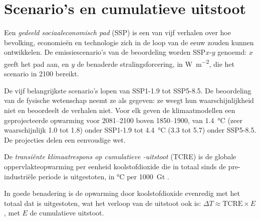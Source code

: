 \section{Scenario's en cumulatieve uitstoot}\label{sec:b2:anthropogenic-climate-change:scenarios}

\begin{definition}\label{def:b2:anthropogenic-climate-change:ssp}
Een \emph{gedeeld sociaaleconomisch pad} (SSP) is een van vijf
verhalen over hoe bevolking, economieën en technologie zich in de loop van de eeuw zouden kunnen ontwikkelen. De
emissiescenario's van de beoordeling worden SSP$x$-$y$ genoemd: $x$ geeft het pad aan, en $y$ de
benaderde stralingsforcering, in \unit{W.m^{-2}}, die het scenario in 2100 bereikt.
\end{definition}

De vijf belangrijkste scenario's lopen van SSP1-1.9 tot SSP5-8.5. De beoordeling van de fysische wetenschap neemt ze als
gegeven: ze weegt hun waarschijnlijkheid niet en beoordeelt de verhalen niet. Voor elk geven de klimaatmodellen
een geprojecteerde opwarming voor 2081--2100 boven 1850--1900, van \qty{1.4}{\celsius} (zeer waarschijnlijk 1.0
tot 1.8) onder SSP1-1.9 tot \qty{4.4}{\celsius} (3.3 tot 5.7) onder SSP5-8.5. De projecties delen een
eenvoudige wet.

\begin{definition}\label{def:b2:anthropogenic-climate-change:tcre}
De \emph{transiënte klimaatrespons op cumulatieve -uitstoot}
(TCRE) is de globale oppervlakteopwarming per eenheid
koolstofdioxide die in totaal sinds de pre-industriële periode is uitgestoten, in \unit{\celsius} per
\qty{1000}{Gt} .
\end{definition}

\begin{proposition}\label{prop:b2:anthropogenic-climate-change:tcre}
In goede benadering is de opwarming door koolstofdioxide evenredig met het totaal dat is uitgestoten,
wat het verloop van de uitstoot ook is: $\Delta T \approx \text{TCRE} \times E$, met $E$ de cumulatieve
uitstoot.
\end{proposition}
\admitted

